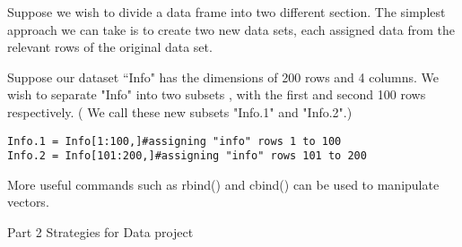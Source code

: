 Suppose we wish to divide a data frame into two different section. The simplest approach we can take is to create two new data sets, each assigned data from the relevant rows of the original data set.

Suppose our dataset ``Info" has the dimensions of 200 rows and 4 columns. We wish to separate "Info" into two subsets , with the first and second 100 rows respectively. ( We call these new subsets "Info.1" and "Info.2".)
\begin{verbatim}
Info.1 = Info[1:100,]#assigning "info" rows 1 to 100
Info.2 = Info[101:200,]#assigning "info" rows 101 to 200
\end{verbatim}

More useful commands such as rbind() and cbind()  can be used to manipulate vectors.

Part 2 Strategies for Data project
